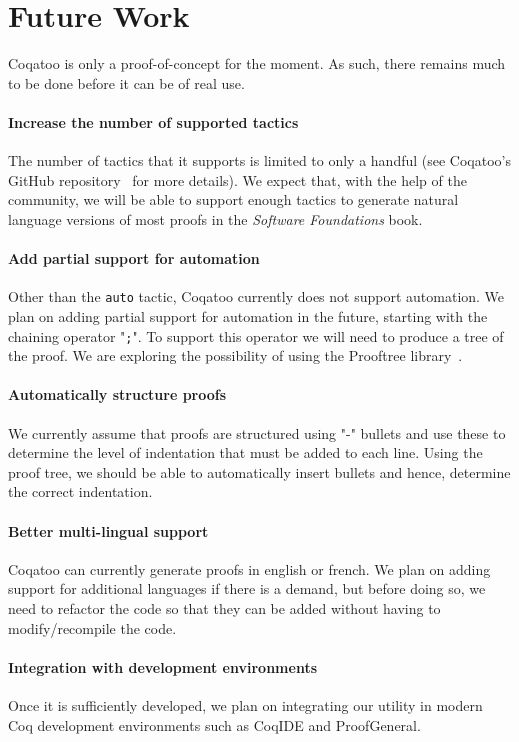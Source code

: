 \documentclass[sigplan,review,9pt]{acmart}\settopmatter{printfolios=true,printccs=false,printacmref=false}
\begin{document}
\pagebreak
\section{Future Work}
Coqatoo is only a proof-of-concept for the moment. As such, there remains much to be done before it can be of real use. 

\paragraph{Increase the number of supported tactics}
The number of tactics that it supports is limited to only a handful (see Coqatoo's GitHub repository~\cite{Coqatoo} for more details). We expect that, with the help of the community, we will be able to support enough tactics to generate natural language versions of most proofs in the \emph{Software Foundations} book.

\paragraph{Add partial support for automation}
Other than the \lstinline{auto} tactic, Coqatoo currently does not support automation. We plan on adding partial support for automation in the future, starting with the chaining operator "\lstinline{;}". To support this operator we will need to produce a tree of the proof. We are exploring the possibility of using the Prooftree library~\cite{Prooftree}.


\paragraph{Automatically structure proofs}
We currently assume that proofs are structured using "-" bullets and use these to determine the level of indentation that must be added to each line. Using the proof tree, we should be able to automatically insert bullets and hence, determine the correct indentation.

\paragraph{Better multi-lingual support}
Coqatoo can currently generate proofs in english or french. We plan on adding support for additional languages if there is a demand, but before doing so, we need to refactor the code so that they can be added without having to modify/recompile the code.

\paragraph{Integration with development environments} Once it is sufficiently developed, we plan on integrating our utility in modern Coq development environments such as CoqIDE and ProofGeneral.
\end{document}
